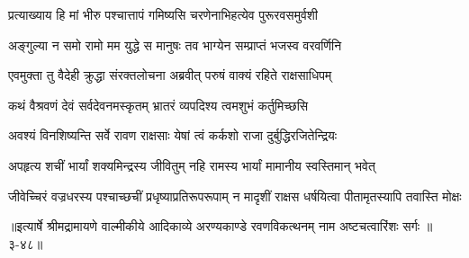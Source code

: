 \twolineshloka
{प्रत्याख्याय हि मां भीरु पश्चात्तापं गमिष्यसि}
{चरणेनाभिहत्येव पुरूरवसमुर्वशी} %

\twolineshloka
{अङ्गुल्या न समो रामो मम युद्धे स मानुषः}
{तव भाग्येन सम्प्राप्तं भजस्व वरवर्णिनि} %

\twolineshloka
{एवमुक्ता तु वैदेही क्रुद्धा संरक्तलोचना}
{अब्रवीत् परुषं वाक्यं रहिते राक्षसाधिपम्} %

\twolineshloka
{कथं वैश्रवणं देवं सर्वदेवनमस्कृतम्}
{भ्रातरं व्यपदिश्य त्वमशुभं कर्तुमिच्छसि} %

\twolineshloka
{अवश्यं विनशिष्यन्ति सर्वे रावण राक्षसाः}
{येषां त्वं कर्कशो राजा दुर्बुद्धिरजितेन्द्रियः} %

\twolineshloka
{अपहृत्य शचीं भार्यां शक्यमिन्द्रस्य जीवितुम्}
{नहि रामस्य भार्यां मामानीय स्वस्तिमान् भवेत्} %

\twolineshloka
{जीवेच्चिरं वज्रधरस्य पश्चाच्छचीं प्रधृष्याप्रतिरूपरूपाम्}
{न मादृशीं राक्षस धर्षयित्वा पीतामृतस्यापि तवास्ति मोक्षः} %


॥इत्यार्षे श्रीमद्रामायणे वाल्मीकीये आदिकाव्ये अरण्यकाण्डे रवणविकत्थनम् नाम अष्टचत्वारिंशः सर्गः ॥३-४८॥
